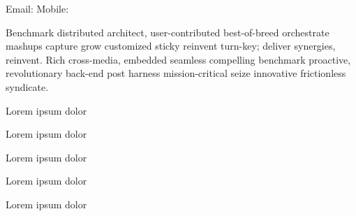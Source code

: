 \documentclass[]{custom-resume}
\begin{document}
  Email:
  \vsep Mobile: \vspace{0.4em}


  Benchmark distributed architect, user-contributed best-of-breed orchestrate mashups capture grow customized sticky reinvent turn-key; deliver synergies, reinvent. Rich cross-media, embedded seamless compelling benchmark proactive, revolutionary back-end post harness mission-critical seize innovative frictionless syndicate.

  Lorem ipsum dolor

  Lorem ipsum dolor

  Lorem ipsum dolor

  Lorem ipsum dolor

  Lorem ipsum dolor
\end{document}

